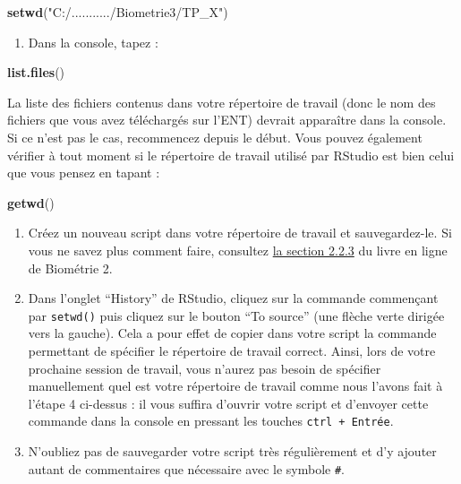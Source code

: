 \documentclass[
  a4paper,
]{article}
\newenvironment{Shaded}{\begin{snugshade}}{\end{snugshade}}
\newcommand{\KeywordTok}[1]{\textcolor[rgb]{0.12,0.11,0.11}{\textbf{#1}}}
\newcommand{\NormalTok}[1]{\textcolor[rgb]{0.12,0.11,0.11}{#1}}
\newcommand{\StringTok}[1]{\textcolor[rgb]{0.75,0.01,0.01}{#1}}
\providecommand{\tightlist}{%
  \setlength{\itemsep}{0pt}\setlength{\parskip}{0pt}}
\begin{document}
\begin{Shaded}
\begin{Highlighting}[]
\KeywordTok{setwd}\NormalTok{(}\StringTok{"C:/.........../Biometrie3/TP_X"}\NormalTok{)}
\end{Highlighting}
\end{Shaded}

\begin{enumerate}
\def\labelenumi{\arabic{enumi}.}
\setcounter{enumi}{4}
\tightlist
\item
  Dans la console, tapez :
\end{enumerate}

\begin{Shaded}
\begin{Highlighting}[]
\KeywordTok{list.files}\NormalTok{()}
\end{Highlighting}
\end{Shaded}

La liste des fichiers contenus dans votre répertoire de travail (donc le nom des fichiers que vous avez téléchargés sur l'ENT) devrait apparaître dans la console. Si ce n'est pas le cas, recommencez depuis le début. Vous pouvez également vérifier à tout moment si le répertoire de travail utilisé par RStudio est bien celui que vous pensez en tapant :

\begin{Shaded}
\begin{Highlighting}[]
\KeywordTok{getwd}\NormalTok{()}
\end{Highlighting}
\end{Shaded}

\begin{enumerate}
\def\labelenumi{\arabic{enumi}.}
\setcounter{enumi}{5}
\tightlist
\item
  Créez un nouveau script dans votre répertoire de travail et sauvegardez-le. Si vous ne savez plus comment faire, consultez \href{https://besibo.github.io/Biometrie2/bases.html\#les-scripts}{la section 2.2.3} du livre en ligne de Biométrie 2.
\item
  Dans l'onglet ``History'' de RStudio, cliquez sur la commande commençant par \texttt{setwd()} puis cliquez sur le bouton ``To source'' (une flèche verte dirigée vers la gauche). Cela a pour effet de copier dans votre script la commande permettant de spécifier le répertoire de travail correct. Ainsi, lors de votre prochaine session de travail, vous n'aurez pas besoin de spécifier manuellement quel est votre répertoire de travail comme nous l'avons fait à l'étape 4 ci-dessus : il vous suffira d'ouvrir votre script et d'envoyer cette commande dans la console en pressant les touches \texttt{ctrl\ +\ Entrée}.
\item
  N'oubliez pas de sauvegarder votre script très régulièrement et d'y ajouter autant de commentaires que nécessaire avec le symbole \texttt{\#}.
\end{enumerate}
\end{document}
